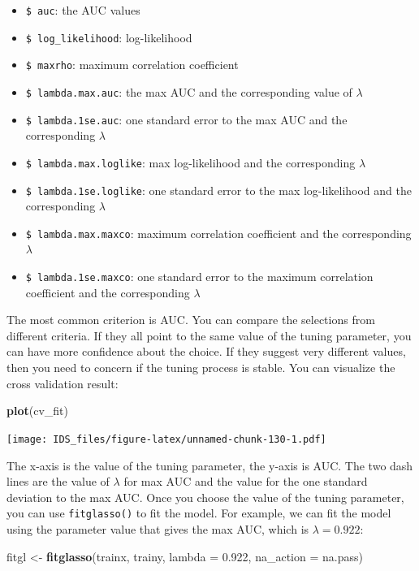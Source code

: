 \documentclass[12pt,]{krantz}
\makeatletter
\newenvironment{Shaded}{\begin{snugshade}}{\end{snugshade}}
\newcommand{\DataTypeTok}[1]{\textcolor[rgb]{0.27,0.27,0.27}{#1}}
\newcommand{\FloatTok}[1]{\textcolor[rgb]{0.06,0.06,0.06}{#1}}
\newcommand{\KeywordTok}[1]{\textcolor[rgb]{0.27,0.27,0.27}{\textbf{#1}}}
\newcommand{\NormalTok}[1]{#1}
\newcommand{\StringTok}[1]{\textcolor[rgb]{0.5,0.5,0.5}{#1}}
\providecommand{\tightlist}{%
  \setlength{\itemsep}{0pt}\setlength{\parskip}{0pt}}
\newenvironment{kframe}{%
\medskip{}
\setlength{\fboxsep}{.8em}
 \def\at@end@of@kframe{}%
 \ifinner\ifhmode%
  \def\at@end@of@kframe{\end{minipage}}%
  \begin{minipage}{\columnwidth}%
 \fi\fi%
 \def\FrameCommand##1{\hskip\@totalleftmargin \hskip-\fboxsep
 \colorbox{shadecolor}{##1}\hskip-\fboxsep
     \hskip-\linewidth \hskip-\@totalleftmargin \hskip\columnwidth}%
 \MakeFramed {\advance\hsize-\width
   \@totalleftmargin\z@ \linewidth\hsize
   \@setminipage}}%
 {\par\unskip\endMakeFramed%
 \at@end@of@kframe}
\renewenvironment{Shaded}{\begin{kframe}}{\end{kframe}}
\makeatother
\begin{document}
\begin{itemize}
\tightlist
\item
  \texttt{\$\ auc}: the AUC values
\item
  \texttt{\$\ log\_likelihood}: log-likelihood
\item
  \texttt{\$\ maxrho}: maximum correlation coefficient
\item
  \texttt{\$\ lambda.max.auc}: the max AUC and the corresponding value of \(\lambda\)
\item
  \texttt{\$\ lambda.1se.auc}: one standard error to the max AUC and the corresponding \(\lambda\)
\item
  \texttt{\$\ lambda.max.loglike}: max log-likelihood and the corresponding \(\lambda\)
\item
  \texttt{\$\ lambda.1se.loglike}: one standard error to the max log-likelihood and the corresponding \(\lambda\)
\item
  \texttt{\$\ lambda.max.maxco}: maximum correlation coefficient and the corresponding \(\lambda\)
\item
  \texttt{\$\ lambda.1se.maxco}: one standard error to the maximum correlation coefficient and the corresponding \(\lambda\)
\end{itemize}

The most common criterion is AUC. You can compare the selections from different criteria. If they all point to the same value of the tuning parameter, you can have more confidence about the choice. If they suggest very different values, then you need to concern if the tuning process is stable. You can visualize the cross validation result:

\begin{Shaded}
\begin{Highlighting}[]
\KeywordTok{plot}\NormalTok{(cv_fit)}
\end{Highlighting}
\end{Shaded}

\texttt{[image: IDS\_files/figure-latex/unnamed-chunk-130-1.pdf]}

The x-axis is the value of the tuning parameter, the y-axis is AUC. The two dash lines are the value of \(\lambda\) for max AUC and the value for the one standard deviation to the max AUC. Once you choose the value of the tuning parameter, you can use \texttt{fitglasso()} to fit the model. For example, we can fit the model using the parameter value that gives the max AUC, which is \(\lambda=0.922\):

\begin{Shaded}
\begin{Highlighting}[]
\NormalTok{fitgl <-}\StringTok{ }\KeywordTok{fitglasso}\NormalTok{(trainx, trainy, }
                   \DataTypeTok{lambda =} \FloatTok{0.922}\NormalTok{, }\DataTypeTok{na_action =}\NormalTok{ na.pass)}
\end{Highlighting}
\end{Shaded}
\end{document}
